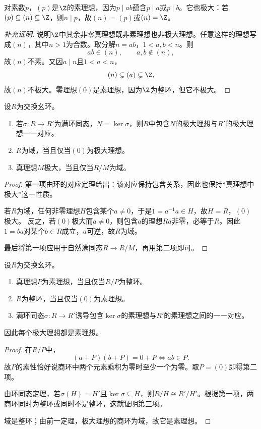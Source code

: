 \begin{example}
对素数$p$，$(p)$是$\Z$的素理想，因为$p\mid ab$蕴含$p\mid a$或$p\mid b$。它也极大：若$(p)\subseteq(n)\subseteq\Z$，则$n\mid p$，故$(n)=(p)$或$(n)=\Z$。
\end{example}
\begin{proof}[补充证明]
说明$\Z$中其余非零真理想既非素理想也非极大理想。任意这样的理想写成$(n)$，其中$n>1$为合数。取分解$n=ab$，$1<a,b<n$。则
\[
ab\in(n),\qquad a,b\notin(n),
\]
故$(n)$不素。又因$a\mid n$且$1<a<n$，
\[
(n)\subsetneq(a)\subsetneq\Z,
\]
故$(n)$不极大。零理想$(0)$是素理想，因为$\Z$为整环，但它不极大。
\end{proof}

\begin{theorem}\label{p2:prime-maximal}
设$R$为交换幺环。
\begin{enumerate}
\item 若$\sigma:R\to R'$为满环同态，$N=\ker\sigma$，则$R$中包含$N$的极大理想与$R'$的极大理想一一对应。
\item $R$为域，当且仅当$(0)$为极大理想。
\item 真理想$M$极大，当且仅当$R/M$为域。
\end{enumerate}
\end{theorem}
\begin{proof}
第一项由环的对应定理给出：该对应保持包含关系，因此也保持“真理想中极大”这一性质。

若$R$为域，任何非零理想$H$包含某个$a\ne0$，于是$1=a^{-1}a\in H$，故$H=R$，$(0)$极大。
反之，若$(0)$极大而$a\ne0$，则包含$a$的理想$Ra$非零，必等于$R$。因此$1=ba$对某个$b\in R$成立，$a$可逆，故$R$为域。

最后将第一项应用于自然满同态$R\to R/M$，再用第二项即可。
\end{proof}

\begin{theorem}\label{p2:prime-domain}
设$R$为交换幺环。
\begin{enumerate}
\item 真理想$P$为素理想，当且仅当$R/P$为整环。
\item $R$为整环，当且仅当$(0)$为素理想。
\item 满环同态$\sigma:R\to R'$诱导包含$\ker\sigma$的素理想与$R'$的素理想之间的一一对应。
\end{enumerate}
因此每个极大理想都是素理想。
\end{theorem}
\begin{proof}
在$R/P$中，
\[
(a+P)(b+P)=0+P\iff ab\in P.
\]
故$P$的素性恰好说商环中两个元素乘积为零时至少一个为零。取$P=(0)$即得第二项。

由环同态定理，若$\sigma(H)=H'$且$\ker\sigma\subseteq H$，则$R/H\cong R'/H'$。根据第一项，两商环同时为整环或同时不是整环，这就证明第三项。

域是整环；由前一定理，极大理想的商环为域，故它是素理想。
\end{proof}

